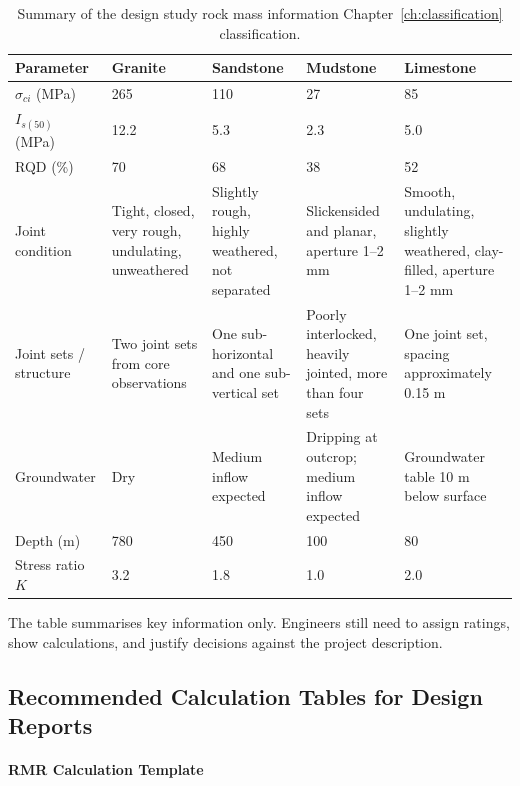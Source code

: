 \begin{table}[H]
\centering
\scriptsize
\begin{tabularx}{\textwidth}{l Y Y Y Y}
\toprule
\textbf{Parameter} & \textbf{Granite} & \textbf{Sandstone} & \textbf{Mudstone} & \textbf{Limestone} \\
\midrule
\(\sigma_{ci}\) (MPa) & 265 & 110 & 27 & 85 \\
\(I_{s(50)}\) (MPa) & 12.2 & 5.3 & 2.3 & 5.0 \\
RQD (\%) & 70 & 68 & 38 & 52 \\
Joint condition & Tight, closed, very rough, undulating, unweathered & Slightly rough, highly weathered, not separated & Slickensided and planar, aperture 1--2 mm & Smooth, undulating, slightly weathered, clay-filled, aperture 1--2 mm \\
Joint sets / structure & Two joint sets from core observations & One sub-horizontal and one sub-vertical set & Poorly interlocked, heavily jointed, more than four sets & One joint set, spacing approximately 0.15 m \\
Groundwater & Dry & Medium inflow expected & Dripping at outcrop; medium inflow expected & Groundwater table 10 m below surface \\
Depth (m) & 780 & 450 & 100 & 80 \\
Stress ratio \(K\) & 3.2 & 1.8 & 1.0 & 2.0 \\
\bottomrule
\end{tabularx}
\caption{Summary of the design study rock mass information Chapter~\ref{ch:classification} classification.}
\label{tab:ch3-project-data}
\end{table}

\begin{notebox}
The table summarises key information only. Engineers still need to assign ratings,
show calculations, and justify decisions against the project description.
\end{notebox}

\subsection{Recommended Calculation Tables for Design Reports}

\paragraph{RMR Calculation Template}

